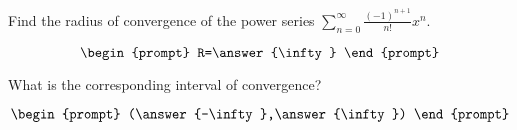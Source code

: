 \documentclass{ximera}
\author{Gregory Hartman \and Matthew Carr}
\begin{document}
\begin{exercise}




Find the radius of convergence of the power series $\sum_{n=0}^{\infty}\frac{(-1)^{n+1}}{n!}x^n$.

\[
\begin{prompt}
R=\answer{\infty}
\end{prompt}
\]

What is the corresponding interval of convergence?

\[
\begin{prompt}
(\answer{-\infty},\answer{\infty})
\end{prompt}
\]

\end{exercise}
\end{document}
